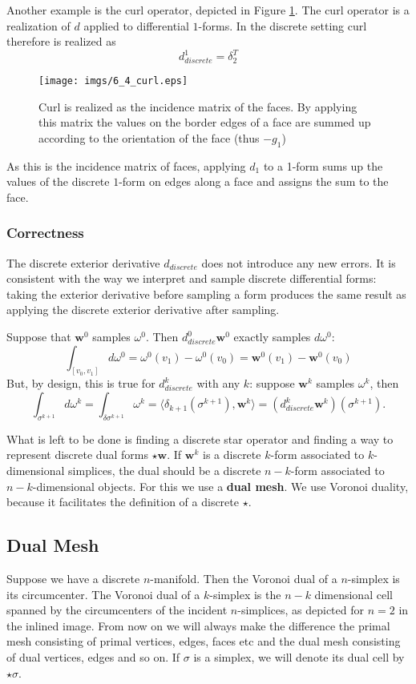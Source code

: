 Another example is the curl operator, depicted in Figure \ref{fig::6_1_curl}. The curl operator is a realization of $d$ applied to differential $1$-forms. In the discrete setting curl therefore is realized as
\[d_{discrete}^1 = \delta_2^T\]
\begin{figure}[t]
\begin{center}
\texttt{[image: imgs/6\_4\_curl.eps]}
\end{center}
\caption{Curl is realized as the incidence matrix of the faces. By applying this matrix the values on the border edges of a face are summed up according to the orientation of the face (thus $-g_1$)}
\label{fig::6_1_curl}
\end{figure}

\noindent As this is the incidence matrix of faces, applying $d_1$ to a 1-form sums up the values of the discrete $1$-form on edges along a face and assigns the sum to the face. 

\subsubsection{Correctness}
The discrete exterior derivative $d_{discrete}$ does not introduce any new errors. It is consistent with the way we interpret and sample discrete differential forms: taking the exterior derivative before sampling a form produces the same result as applying the discrete exterior derivative after sampling.

Suppose that $\textbf{w}^0$ samples $\omega^0$. Then $d_{discrete}^0 \textbf{w}^0$ exactly samples $d\omega^0$:
\[\int_{[v_0,v_1]} d\omega^0 = \omega^0(v_1) - \omega^0(v_0)= \textbf{w}^0(v_1) - \textbf{w}^0(v_0)\] 
But, by design, this is true for $d_{discrete}^k$ with any $k$: suppose $\textbf{w}^k$ samples $\omega^k$, then
\[\int_{\sigma^{k+1}} d\omega^k  = \int_{\delta \sigma^{k+1}} \omega^k = \langle \delta_{k+1}(\sigma^{k+1}), \textbf{w}^k\rangle = (d_{discrete}^{k} \textbf{w}^k) (\sigma^{k+1}).\]

What is left to be done is finding a discrete star operator and finding a way to represent discrete dual forms $\star \textbf{w}$. If $\textbf{w}^k$ is a discrete $k$-form associated to $k$-dimensional simplices, the dual should be a discrete $n-k$-form associated to $n-k$-dimensional objects. For this we use a \textbf{dual mesh}. We use Voronoi duality, because it facilitates the definition of a discrete $\star$.

\subsection{Dual Mesh}
Suppose we have a discrete $n$-manifold. Then the Voronoi dual of a $n$-simplex is its circumcenter. The Voronoi dual of a $k$-simplex is the $n-k$ dimensional cell spanned by the circumcenters of the incident $n$-simplices, as depicted for $n=2$ in the inlined image. From now on we will always make the difference the primal mesh consisting of primal vertices, edges, faces etc and the dual mesh consisting of dual vertices, edges and so on. If $\sigma$ is a simplex, we will denote its dual cell by $\star \sigma$.

